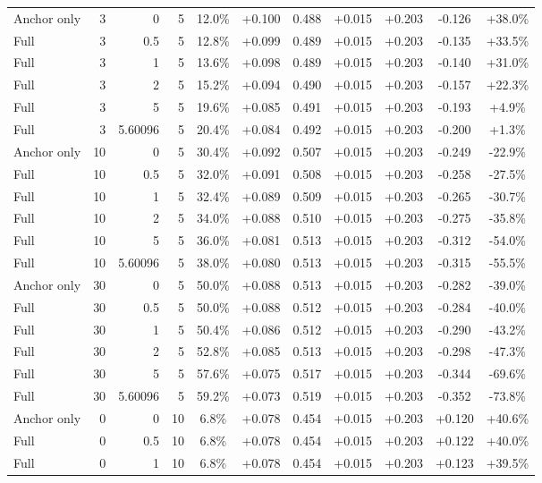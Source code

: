 \begin{table}[htbp]
\begin{tabular}{lrrrccccccc}
Anchor only & 3 & 0 & 5 & 12.0\% & +0.100 & 0.488 & +0.015 & +0.203 & -0.126 & +38.0\% \\
Full & 3 & 0.5 & 5 & 12.8\% & +0.099 & 0.489 & +0.015 & +0.203 & -0.135 & +33.5\% \\
Full & 3 & 1 & 5 & 13.6\% & +0.098 & 0.489 & +0.015 & +0.203 & -0.140 & +31.0\% \\
Full & 3 & 2 & 5 & 15.2\% & +0.094 & 0.490 & +0.015 & +0.203 & -0.157 & +22.3\% \\
Full & 3 & 5 & 5 & 19.6\% & +0.085 & 0.491 & +0.015 & +0.203 & -0.193 & +4.9\% \\
Full & 3 & 5.60096 & 5 & 20.4\% & +0.084 & 0.492 & +0.015 & +0.203 & -0.200 & +1.3\% \\
Anchor only & 10 & 0 & 5 & 30.4\% & +0.092 & 0.507 & +0.015 & +0.203 & -0.249 & -22.9\% \\
Full & 10 & 0.5 & 5 & 32.0\% & +0.091 & 0.508 & +0.015 & +0.203 & -0.258 & -27.5\% \\
Full & 10 & 1 & 5 & 32.4\% & +0.089 & 0.509 & +0.015 & +0.203 & -0.265 & -30.7\% \\
Full & 10 & 2 & 5 & 34.0\% & +0.088 & 0.510 & +0.015 & +0.203 & -0.275 & -35.8\% \\
Full & 10 & 5 & 5 & 36.0\% & +0.081 & 0.513 & +0.015 & +0.203 & -0.312 & -54.0\% \\
Full & 10 & 5.60096 & 5 & 38.0\% & +0.080 & 0.513 & +0.015 & +0.203 & -0.315 & -55.5\% \\
Anchor only & 30 & 0 & 5 & 50.0\% & +0.088 & 0.513 & +0.015 & +0.203 & -0.282 & -39.0\% \\
Full & 30 & 0.5 & 5 & 50.0\% & +0.088 & 0.512 & +0.015 & +0.203 & -0.284 & -40.0\% \\
Full & 30 & 1 & 5 & 50.4\% & +0.086 & 0.512 & +0.015 & +0.203 & -0.290 & -43.2\% \\
Full & 30 & 2 & 5 & 52.8\% & +0.085 & 0.513 & +0.015 & +0.203 & -0.298 & -47.3\% \\
Full & 30 & 5 & 5 & 57.6\% & +0.075 & 0.517 & +0.015 & +0.203 & -0.344 & -69.6\% \\
Full & 30 & 5.60096 & 5 & 59.2\% & +0.073 & 0.519 & +0.015 & +0.203 & -0.352 & -73.8\% \\
Anchor only & 0 & 0 & 10 & 6.8\% & +0.078 & 0.454 & +0.015 & +0.203 & +0.120 & +40.6\% \\
Full & 0 & 0.5 & 10 & 6.8\% & +0.078 & 0.454 & +0.015 & +0.203 & +0.122 & +40.0\% \\
Full & 0 & 1 & 10 & 6.8\% & +0.078 & 0.454 & +0.015 & +0.203 & +0.123 & +39.5\% \\

\end{tabular}
\end{table}
